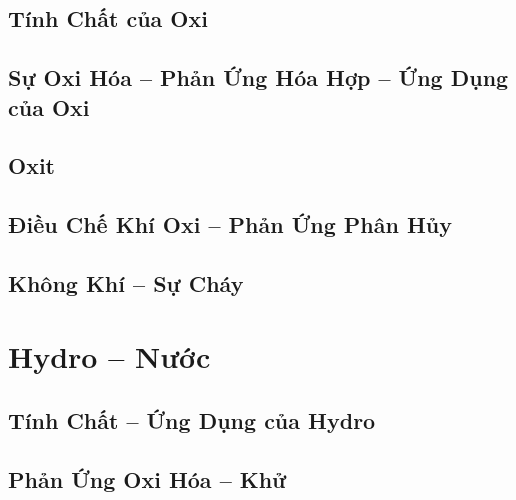 \documentclass{article}
\numberwithin{equation}{section}
\begin{document}
\subsection{Tính Chất của Oxi}


\subsection{Sự Oxi Hóa -- Phản Ứng Hóa Hợp -- Ứng Dụng của Oxi}


\subsection{Oxit}


\subsection{Điều Chế Khí Oxi -- Phản Ứng Phân Hủy}


\subsection{Không Khí -- Sự Cháy}


\section{Hydro -- Nước}

\subsection{Tính Chất -- Ứng Dụng của Hydro}


\subsection{Phản Ứng Oxi Hóa -- Khử}
\end{document}
